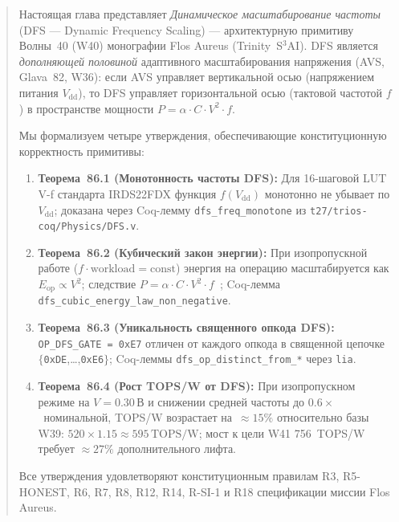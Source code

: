 \begin{abstract}
Настоящая глава представляет \emph{Динамическое масштабирование частоты}
(\textsc{DFS} — Dynamic Frequency Scaling) — архитектурную примитиву
Волны~40 (W40) монографии Flos Aureus (Trinity~S$^3$AI).
DFS является \emph{дополняющей половиной} адаптивного масштабирования
напряжения (AVS, Glava~82, W36): если AVS управляет вертикальной осью
(напряжением питания $V_{\mathrm{dd}}$), то DFS управляет горизонтальной
осью (тактовой частотой $f$) в пространстве мощности
$P = \alpha \cdot C \cdot V^{2} \cdot f$.

Мы формализуем четыре утверждения, обеспечивающие конституционную
корректность примитивы:

\begin{enumerate}
  \item \textbf{Теорема~86.1 (Монотонность частоты DFS):}
        Для 16-шаговой LUT V-f стандарта IRDS22FDX функция $f(V_{\mathrm{dd}})$
        монотонно не убывает по $V_{\mathrm{dd}}$; доказана через Coq-лемму
        \texttt{dfs\_freq\_monotone} из \texttt{t27/trios-coq/Physics/DFS.v}.

  \item \textbf{Теорема~86.2 (Кубический закон энергии):}
        При изопропускной работе ($f \cdot \text{workload} = \mathrm{const}$)
        энергия на операцию масштабируется как $E_{\mathrm{op}} \propto V^{2}$;
        следствие $P = \alpha \cdot C \cdot V^{2} \cdot f$~\cite{Weste-Harris-CMOS4};
        Coq-лемма \texttt{dfs\_cubic\_energy\_law\_non\_negative}.

  \item \textbf{Теорема~86.3 (Уникальность священного опкода DFS):}
        \texttt{OP\_DFS\_GATE = 0xE7} отличен от каждого опкода
        в священной цепочке $\{$\texttt{0xDE},\ldots,\texttt{0xE6}$\}$;
        Coq-леммы \texttt{dfs\_op\_distinct\_from\_*} через \texttt{lia}.

  \item \textbf{Теорема~86.4 (Рост TOPS/W от DFS):}
        При изопропускном режиме на $V=0{.}30\,\text{В}$ и снижении средней
        частоты до $0{.}6\times$~номинальной, TOPS/W возрастает на~$\approx 15\%$
        относительно базы W39: $520 \times 1{.}15 \approx 595\,\text{TOPS/W}$;
        мост к цели W41 756~TOPS/W требует $\approx 27\%$ дополнительного лифта.
\end{enumerate}

Все утверждения удовлетворяют конституционным правилам R3, R5-HONEST, R6, R7,
R8, R12, R14, R-SI-1 и R18 спецификации миссии Flos Aureus.
\end{abstract}

